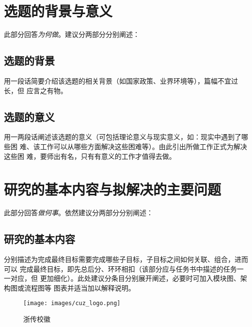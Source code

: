 \section{选题的背景与意义}

\begin{tcolorbox}
	此部分回答\emph{为何做}。建议分两部分分别阐述：
\end{tcolorbox}

\subsection{选题的背景}

\begin{tcolorbox}
	用一段话简要介绍该选题的相关背景（如国家政策、业界环境等），篇幅不宜过长，但
	应言之有物。
\end{tcolorbox}

\subsection{选题的意义}

\begin{tcolorbox}
	用一两段话阐述该选题的意义（可包括理论意义与现实意义，如：现实中遇到了哪些困
	难、该工作可以从哪些方面解决这些困难等）。由此引出所做工作正式为解决这些困
	难，要师出有名，只有有意义的工作才值得去做。
\end{tcolorbox}

\section{研究的基本内容与拟解决的主要问题}

\begin{tcolorbox}
	此部分回答\emph{做何事}。依然建议分两部分分别阐述：
\end{tcolorbox}

\subsection{研究的基本内容}

\begin{tcolorbox}
	分别描述为完成最终目标需要完成哪些子目标，子目标之间如何关联、组合，进而可以
	完成最终目标，即先总后分、环环相扣（该部分应与任务书中描述的任务一一对应，但
	更加细化）。此处建议分条目分别展开阐述，必要时可加入模块图、架构图或流程图等
	图表并适当加以解释说明。
\end{tcolorbox}
\begin{figure}[h]
	\centering
	\texttt{[image: images/cuz\_logo.png]}
	\caption{浙传校徽}
	\label{fig:1}
\end{figure}

